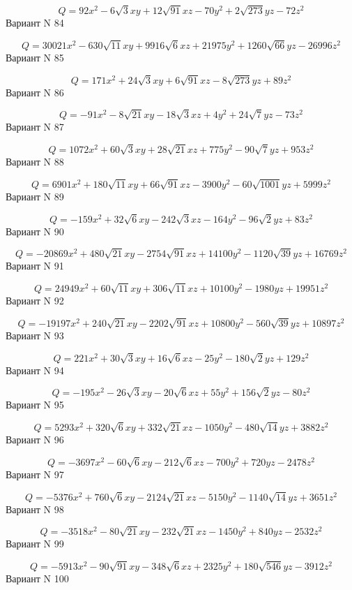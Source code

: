 \documentclass[11pt]{report}
\begin{document}
$$Q = 92 x^{2} - 6 \sqrt{3} x y + 12 \sqrt{91} x z - 70 y^{2} + 2 \sqrt{273} y z - 72 z^{2}$$Вариант N 84

$$Q = 30021 x^{2} - 630 \sqrt{11} x y + 9916 \sqrt{6} x z + 21975 y^{2} + 1260 \sqrt{66} y z - 26996 z^{2}$$Вариант N 85

$$Q = 171 x^{2} + 24 \sqrt{3} x y + 6 \sqrt{91} x z - 8 \sqrt{273} y z + 89 z^{2}$$Вариант N 86

$$Q = - 91 x^{2} - 8 \sqrt{21} x y - 18 \sqrt{3} x z + 4 y^{2} + 24 \sqrt{7} y z - 73 z^{2}$$Вариант N 87

$$Q = 1072 x^{2} + 60 \sqrt{3} x y + 28 \sqrt{21} x z + 775 y^{2} - 90 \sqrt{7} y z + 953 z^{2}$$Вариант N 88

$$Q = 6901 x^{2} + 180 \sqrt{11} x y + 66 \sqrt{91} x z - 3900 y^{2} - 60 \sqrt{1001} y z + 5999 z^{2}$$Вариант N 89

$$Q = - 159 x^{2} + 32 \sqrt{6} x y - 242 \sqrt{3} x z - 164 y^{2} - 96 \sqrt{2} y z + 83 z^{2}$$Вариант N 90

$$Q = - 20869 x^{2} + 480 \sqrt{21} x y - 2754 \sqrt{91} x z + 14100 y^{2} - 1120 \sqrt{39} y z + 16769 z^{2}$$Вариант N 91

$$Q = 24949 x^{2} + 60 \sqrt{11} x y + 306 \sqrt{11} x z + 10100 y^{2} - 1980 y z + 19951 z^{2}$$Вариант N 92

$$Q = - 19197 x^{2} + 240 \sqrt{21} x y - 2202 \sqrt{91} x z + 10800 y^{2} - 560 \sqrt{39} y z + 10897 z^{2}$$Вариант N 93

$$Q = 221 x^{2} + 30 \sqrt{3} x y + 16 \sqrt{6} x z - 25 y^{2} - 180 \sqrt{2} y z + 129 z^{2}$$Вариант N 94

$$Q = - 195 x^{2} - 26 \sqrt{3} x y - 20 \sqrt{6} x z + 55 y^{2} + 156 \sqrt{2} y z - 80 z^{2}$$Вариант N 95

$$Q = 5293 x^{2} + 320 \sqrt{6} x y + 332 \sqrt{21} x z - 1050 y^{2} - 480 \sqrt{14} y z + 3882 z^{2}$$Вариант N 96

$$Q = - 3697 x^{2} - 60 \sqrt{6} x y - 212 \sqrt{6} x z - 700 y^{2} + 720 y z - 2478 z^{2}$$Вариант N 97

$$Q = - 5376 x^{2} + 760 \sqrt{6} x y - 2124 \sqrt{21} x z - 5150 y^{2} - 1140 \sqrt{14} y z + 3651 z^{2}$$Вариант N 98

$$Q = - 3518 x^{2} - 80 \sqrt{21} x y - 232 \sqrt{21} x z - 1450 y^{2} + 840 y z - 2532 z^{2}$$Вариант N 99

$$Q = - 5913 x^{2} - 90 \sqrt{91} x y - 348 \sqrt{6} x z + 2325 y^{2} + 180 \sqrt{546} y z - 3912 z^{2}$$Вариант N 100
\end{document}
